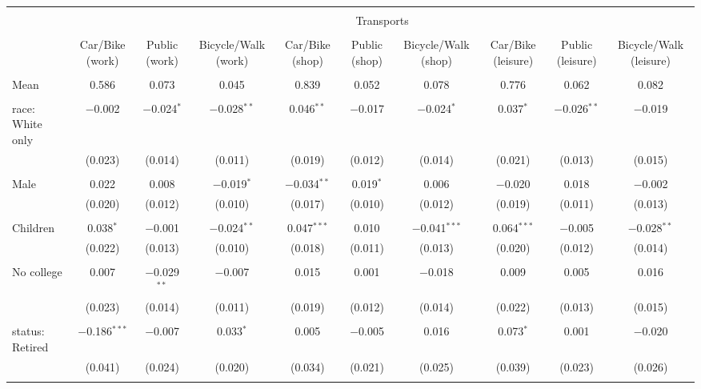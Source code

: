 
\begin{tabular}{@{\extracolsep{5pt}}lccccccccc} 
\\[-1.8ex]\hline 
\hline \\[-1.8ex] 
 & \multicolumn{9}{c}{Transports} \\ 
\cline{2-10} 
\\[-1.8ex] & Car/Bike (work) & Public (work) & Bicycle/Walk (work) & Car/Bike (shop) & Public (shop) & Bicycle/Walk (shop) & Car/Bike (leisure) & Public (leisure) & Bicycle/Walk (leisure) \\ 
\hline \\[-1.8ex] 
 Mean & 0.586 & 0.073 & 0.045 & 0.839 & 0.052 & 0.078 & 0.776 & 0.062 & 0.082  \\ \hline \\[-1.8ex] race: White only & $-$0.002 & $-$0.024$^{*}$ & $-$0.028$^{**}$ & 0.046$^{**}$ & $-$0.017 & $-$0.024$^{*}$ & 0.037$^{*}$ & $-$0.026$^{**}$ & $-$0.019 \\ 
  & (0.023) & (0.014) & (0.011) & (0.019) & (0.012) & (0.014) & (0.021) & (0.013) & (0.015) \\ 
  & & & & & & & & & \\ 
 Male & 0.022 & 0.008 & $-$0.019$^{*}$ & $-$0.034$^{**}$ & 0.019$^{*}$ & 0.006 & $-$0.020 & 0.018 & $-$0.002 \\ 
  & (0.020) & (0.012) & (0.010) & (0.017) & (0.010) & (0.012) & (0.019) & (0.011) & (0.013) \\ 
  & & & & & & & & & \\ 
 Children & 0.038$^{*}$ & $-$0.001 & $-$0.024$^{**}$ & 0.047$^{***}$ & 0.010 & $-$0.041$^{***}$ & 0.064$^{***}$ & $-$0.005 & $-$0.028$^{**}$ \\ 
  & (0.022) & (0.013) & (0.010) & (0.018) & (0.011) & (0.013) & (0.020) & (0.012) & (0.014) \\ 
  & & & & & & & & & \\ 
 No college & 0.007 & $-$0.029$^{**}$ & $-$0.007 & 0.015 & 0.001 & $-$0.018 & 0.009 & 0.005 & 0.016 \\ 
  & (0.023) & (0.014) & (0.011) & (0.019) & (0.012) & (0.014) & (0.022) & (0.013) & (0.015) \\ 
  & & & & & & & & & \\ 
 status: Retired & $-$0.186$^{***}$ & $-$0.007 & 0.033$^{*}$ & 0.005 & $-$0.005 & 0.016 & 0.073$^{*}$ & 0.001 & $-$0.020 \\ 
  & (0.041) & (0.024) & (0.020) & (0.034) & (0.021) & (0.025) & (0.039) & (0.023) & (0.026) \\ 
  & & & & & & & & & \\ 

\end{tabular}
